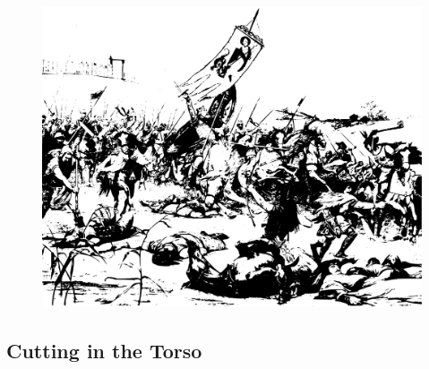 \documentclass[12pt]{book}
\begin{document}
\begin{figure}[h]
    \centering
    \includegraphics[width=\textwidth]{./images/combat06.pdf}
\end{figure}

\subsection{Cutting in the Torso}
\end{document}
